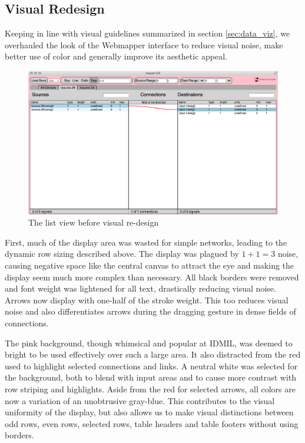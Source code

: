 
	\subsection{Visual Redesign} %
	\label{sec:visual_redesign}

Keeping in line with visual guidelines summarized in section \ref{sec:data_viz}, we overhauled the look of the Webmapper interface to reduce visual noise, make better use of color and generally improve its aesthetic appeal. 

\begin{figure}[h]
\centering
	\includegraphics[width=\textwidth]{figures/before_redesign}
\caption{The list view before visual re-design}
\label{fig:before_redesign}
\end{figure}

First, much of the display area was wasted for simple networks, leading to the dynamic row sizing described above. The display was plagued by $1 + 1 = 3$ noise, causing negative space like the central canvas to attract the eye and making the display seem much more complex than necessary. All black borders were removed and font weight was lightened for all text, drastically reducing visual noise. Arrows now display with one-half of the stroke weight. This too reduces visual noise and also differentiates arrows during the dragging gesture in dense fields of connections.

The pink background, though whimsical and popular at IDMIL, was deemed to bright to be used effectively over such a large area. It also distracted from the red used to highlight selected connections and links. A neutral white was selected for the background, both to blend with input areas and to cause more contrast with row striping and highlights. Aside from the red for selected arrows, all colors are now a variation of an unobtrusive gray-blue. This contributes to the visual uniformity of the display, but also allows us to make visual distinctions between odd rows, even rows, selected rows, table headers and table footers without using borders.

